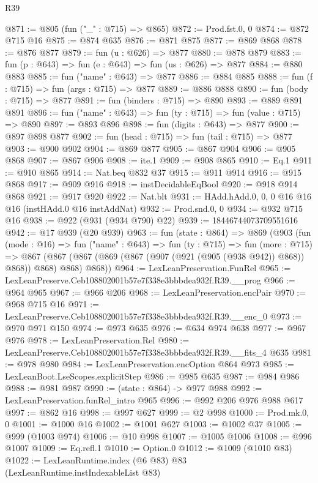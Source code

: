 \begin{lexlean}{R39}
\begin{coremodule}
@871 := @805 (fun ("_" : @715) => @865)
@872 := Prod.fst.{0, 0}
@874 := @872 @715 @16
@875 := @874 @635
@876 := @871 @875
@877 := @869 @868
@878 := @876 @877
@879 := fun (u : @626) => @877
@880 := @878 @879
@883 := fun (p : @643) => fun (e : @643) => fun (us : @626) => @877
@884 := @880 @883
@885 := fun ("name" : @643) => @877
@886 := @884 @885
@888 := fun (f : @715) => fun (args : @715) => @877
@889 := @886 @888
@890 := fun (body : @715) => @877
@891 := fun (binders : @715) => @890
@893 := @889 @891 @891
@896 := fun ("name" : @643) => fun (ty : @715) => fun (value : @715) => @890
@897 := @893 @896
@898 := fun (digits : @643) => @877
@900 := @897 @898 @877
@902 := fun (head : @715) => fun (tail : @715) => @877
@903 := @900 @902
@904 := @869 @877
@905 := @867 @904
@906 := @905 @868
@907 := @867 @906
@908 := ite.{1}
@909 := @908 @865
@910 := Eq.{1}
@911 := @910 @865
@914 := Nat.beq @832 @37
@915 := @911 @914
@916 := @915 @868
@917 := @909 @916
@918 := instDecidableEqBool
@920 := @918 @914 @868
@921 := @917 @920
@922 := Nat.blt
@931 := HAdd.hAdd.{0, 0, 0} @16 @16 @16 (instHAdd.{0} @16 instAddNat)
@932 := Prod.snd.{0, 0}
@934 := @932 @715 @16
@938 := @922 (@931 (@934 @790) @22)
@939 := 18446744073709551616
@942 := @17 @939 (@20 @939)
@963 := fun (state : @864) =>
  @869
    (@903
      (fun (mode : @16) =>
      fun ("name" : @643) =>
      fun (ty : @715) =>
      fun (more : @715) =>
      @867 (@867 (@867 (@869 (@867 (@907 (@921 (@905 (@938 @942)) @868)) @868)) @868) @868) @868))
@964 := LexLeanPreservation.FunRel
@965 := LexLeanPreserve.Ceb108802001b57e7f338e3bbbdea932f.R39.__prog
@966 := @964 @965
@967 := @966 @206
@968 := LexLeanPreservation.encPair
@970 := @968 @715 @16
@971 := LexLeanPreserve.Ceb108802001b57e7f338e3bbbdea932f.R39.__enc_0
@973 := @970 @971 @150
@974 := @973 @635
@976 := @634 @974 @638
@977 := @967 @976
@978 := LexLeanPreservation.Rel
@980 := LexLeanPreserve.Ceb108802001b57e7f338e3bbbdea932f.R39.__fits_4 @635
@981 := @978 @980
@984 := LexLeanPreservation.encOption @864 @973
@985 := LexLeanBoot.LseScopes.explicitStep
@986 := @985 @635
@987 := @984 @986
@988 := @981 @987
@990 := (state : @864) -> @977 @988
@992 := LexLeanPreservation.funRel_intro @965
@996 := @992 @206 @976 @988 @617
@997 := @862 @16
@998 := @997 @627
@999 := @2 @998
@1000 := Prod.mk.{0, 0}
@1001 := @1000 @16
@1002 := @1001 @627
@1003 := @1002 @37
@1005 := @999 (@1003 @974)
@1006 := @10 @998
@1007 := @1005 @1006
@1008 := @996 @1007
@1009 := Eq.refl.{1}
@1010 := Option.{0}
@1012 := @1009 (@1010 @83)
@1022 := LexLeanRuntime.index
    (@6 @83)
    @83
    (LexLeanRuntime.instIndexableList @83)

\end{coremodule}
\end{lexlean}
